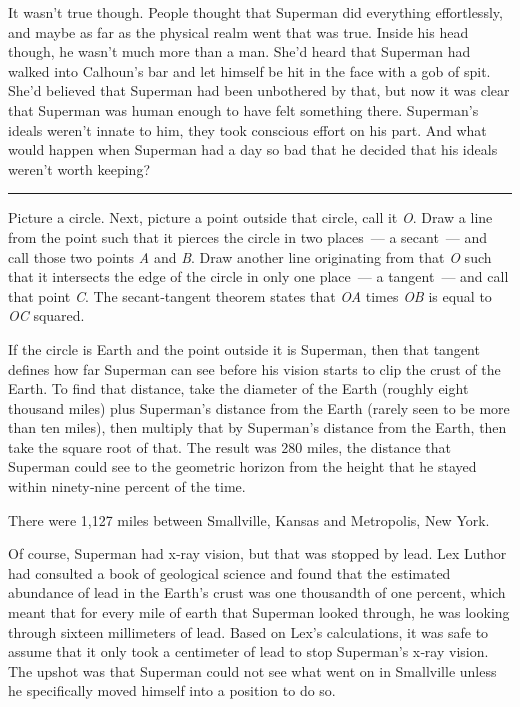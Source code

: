 \documentclass[ebook,12pt]{memoir}
\begin{document}
It wasn't true though. People thought that Superman did everything
effortlessly, and maybe as far as the physical realm went that was true.
Inside his head though, he wasn't much more than a man. She'd heard that
Superman had walked into Calhoun's bar and let himself be hit in the
face with a gob of spit. She'd believed that Superman had been
unbothered by that, but now it was clear that Superman was human enough
to have felt something there. Superman's ideals weren't innate to him,
they took conscious effort on his part. And what would happen when
Superman had a day so bad that he decided that his ideals weren't worth
keeping?

\begin{center}\rule{0.5\linewidth}{\linethickness}\end{center}

Picture a circle. Next, picture a point outside that circle, call it
\emph{O}. Draw a line from the point such that it pierces the circle in
two places~--- a secant~--- and call those two points \emph{A} and
\emph{B}. Draw another line originating from that \emph{O} such that it
intersects the edge of the circle in only one place~--- a tangent~---
and call that point \emph{C}. The secant‐tangent theorem states that
\emph{OA} times \emph{OB} is equal to \emph{OC} squared.

If the circle is Earth and the point outside it is Superman, then that
tangent defines how far Superman can see before his vision starts to
clip the crust of the Earth. To find that distance, take the diameter of
the Earth (roughly eight thousand miles) plus Superman's distance from
the Earth (rarely seen to be more than ten miles), then multiply that by
Superman's distance from the Earth, then take the square root of that.
The result was 280 miles, the distance that Superman could see to the
geometric horizon from the height that he stayed within ninety‐nine
percent of the time.

There were 1,127 miles between Smallville, Kansas and Metropolis, New
York.

Of course, Superman had x‐ray vision, but that was stopped by lead. Lex
Luthor had consulted a book of geological science and found that the
estimated abundance of lead in the Earth's crust was one thousandth of
one percent, which meant that for every mile of earth that Superman
looked through, he was looking through sixteen millimeters of lead.
Based on Lex's calculations, it was safe to assume that it only took a
centimeter of lead to stop Superman's x‐ray vision. The upshot was that
Superman could not see what went on in Smallville unless he specifically
moved himself into a position to do so.
\end{document}
